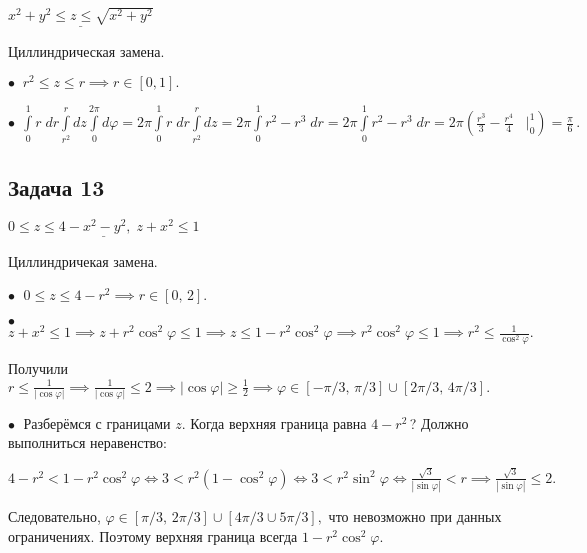 \documentclass[a4paper, fleqn]{article}
\begin{document}
    $\underline{x^2 + y^2 \leq z \leq \sqrt{x^2 + y^2}}$

    Циллиндрическая замена.

    $\bullet \; \; r^2 \leq z \leq r \implies r \in [0, 1].$

    $\bullet \; \, \int\limits_{0}^{1} r \; dr \int\limits_{r^2}^{r} dz \int\limits_{0}^{2 \pi} d \varphi =  2 \pi  \int\limits_{0}^{1} r \; dr \int\limits_{r^2}^{r} dz  =
      2 \pi  \int\limits_{0}^{1} r^2 - r^3 \; dr = 2 \pi  \int\limits_{0}^{1} r^2 - r^3 \; dr = 2 \pi \left( \frac{r^3}{3} - \frac{r^4}{4} \; \; \;
      \Bigg|_{0}^{1} \right) = \boxed{\frac{\pi}{6}} \, .$

    \subsection*{Задача 13} 
    
    $\underline{0 \leq z \leq 4 - x^2 - y^2, \; z + x^2 \leq 1}$
    
    Циллиндричекая замена.
    
    $\bullet \; $ $0 \leq z \leq 4 - r^2 \implies r \in [0, \, 2].$
    
    $\bullet \; $ $z + x^2 \leq 1 \implies z + r^2 \cos^2 \varphi \leq 1 \implies z \leq 1 - r^2 \cos^2 \varphi \implies r^2 \cos^2 \varphi \leq 1 \implies r^2 \leq \frac{1}{\cos^2 \varphi  }.$
    
    
    Получили $r \leq \frac{1}{|\cos \varphi|} \implies  \frac{1}{|\cos \varphi|} \leq 2\implies |\cos \varphi|\geq \frac{1}{2} \implies \varphi \in  [-\pi/3, \, \pi/3] \cup [2 \pi / 3, \, 4 \pi / 3].$
    
    
    $\bullet \;$ Разберёмся с границами $z$. Когда верхняя граница равна $4 - r^2 \, $? Должно выполниться неравенство:
    
    $4 - r^2 < 1 - r^2 \cos ^2 \varphi \iff 3 < r^2 (1 - \cos^2 \varphi) \iff 3 < r^2 \sin^2 \varphi \iff \frac{\sqrt{3}}{ |\sin \varphi| } < r \implies  \frac{\sqrt{3}}{ |\sin \varphi| } \leq 2.$
    
    \doublespacing Следовательно, $ \varphi \in [\pi/3, \, 2\pi/3] \cup [4 \pi / 3 \cup 5 \pi / 3],  $ что невозможно при данных ограничениях. Поэтому верхняя граница всегда $1 - r^2 \cos^2 \varphi.$
    
\end{document}
